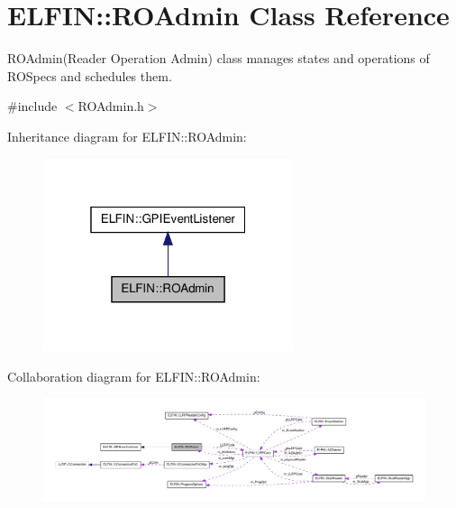 \hypertarget{class_e_l_f_i_n_1_1_r_o_admin}{\section{E\-L\-F\-I\-N\-:\-:R\-O\-Admin Class Reference}
\label{class_e_l_f_i_n_1_1_r_o_admin}
}


R\-O\-Admin(\-Reader Operation Admin) class manages states and operations of R\-O\-Specs and schedules them.  




{\ttfamily \#include $<$R\-O\-Admin.\-h$>$}



Inheritance diagram for E\-L\-F\-I\-N\-:\-:R\-O\-Admin\-:
\nopagebreak
\begin{figure}[H]
\begin{center}
\leavevmode
\includegraphics[width=208pt]{class_e_l_f_i_n_1_1_r_o_admin__inherit__graph}
\end{center}
\end{figure}


Collaboration diagram for E\-L\-F\-I\-N\-:\-:R\-O\-Admin\-:
\nopagebreak
\begin{figure}[H]
\begin{center}
\leavevmode
\includegraphics[width=350pt]{class_e_l_f_i_n_1_1_r_o_admin__coll__graph}
\end{center}
\end{figure}
